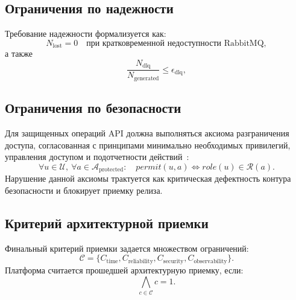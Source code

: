 \subsection{Ограничения по надежности}

Требование надежности формализуется как:
\begin{equation}
N_{\text{lost}} = 0 \quad \text{при кратковременной недоступности RabbitMQ},
\end{equation}
а также
\begin{equation}
\frac{N_{\text{dlq}}}{N_{\text{generated}}} \le \epsilon_{\text{dlq}},
\end{equation}
\where
{}

\subsection{Ограничения по безопасности}

Для защищенных операций API должна выполняться аксиома разграничения доступа, согласованная с принципами минимально необходимых привилегий, управления доступом и подотчетности действий~\cite{nist_sp800_53r5}:
\begin{equation}
\forall u \in \mathcal{U},\ \forall a \in \mathcal{A}_{\text{protected}}:
\quad permit(u,a) \Leftrightarrow role(u) \in \mathcal{R}(a).
\end{equation}
Нарушение данной аксиомы трактуется как критическая дефектность контура безопасности и блокирует приемку релиза.

\subsection{Критерий архитектурной приемки}

Финальный критерий приемки задается множеством ограничений:
\begin{equation}
\mathcal{C} = \{C_{\text{time}}, C_{\text{reliability}}, C_{\text{security}}, C_{\text{observability}}\}.
\end{equation}
Платформа считается прошедшей архитектурную приемку, если:
\begin{equation}
\bigwedge_{c \in \mathcal{C}} c = 1.
\end{equation}
\where
{}


